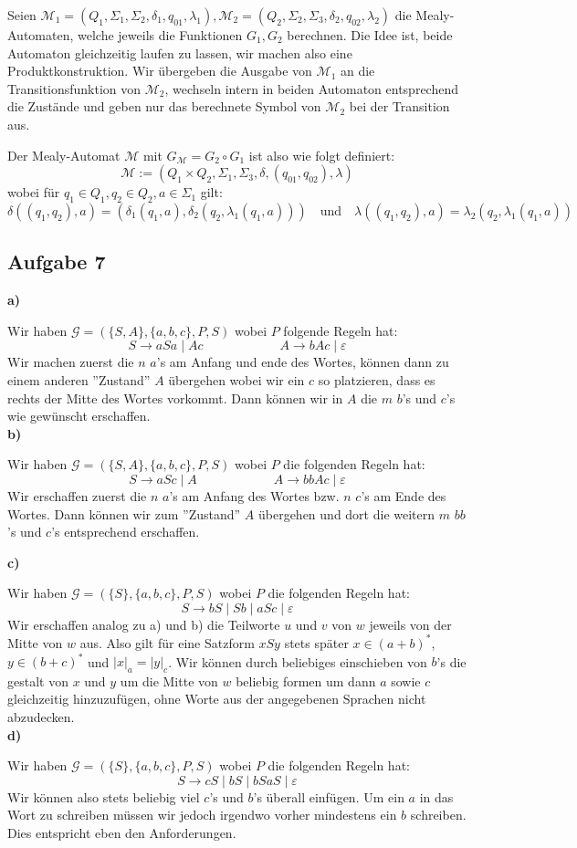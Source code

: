\documentclass[a4paper,graphics,11pt]{article}
\newcommand{\aufgabe}[1]{\subsection*{Aufgabe #1}}
\begin{document}
Seien
$\mathcal{M}_1 = (Q_1, \Sigma_1, \Sigma_2, \delta_1, q_{01}, \lambda_1),
\mathcal{M}_2 = (Q_2, \Sigma_2, \Sigma_3, \delta_2, q_{02}, \lambda_2)$
die Mealy-Automaten, welche jeweils die Funktionen $G_1, G_2$ berechnen.
Die Idee ist, beide Automaton gleichzeitig laufen zu lassen, wir machen also eine Produktkonstruktion.
Wir übergeben die Ausgabe von $\mathcal{M}_1$ an die Transitionsfunktion von $\mathcal{M_2}$, wechseln
intern in beiden Automaton entsprechend die Zustände und geben nur das berechnete Symbol von $\mathcal{M}_2$
bei der Transition aus.

Der Mealy-Automat $\mathcal{M}$ mit $G_{\mathcal{M}} = G_2 \circ G_1$ ist also wie folgt definiert:
$$
    \mathcal{M} := (Q_1 \times Q_2, \Sigma_1, \Sigma_3, \delta, (q_{01}, q_{02}), \lambda)
$$
wobei für $q_1 \in Q_1, q_2 \in Q_2, a \in \Sigma_1$ gilt:
$$
    \delta((q_1,q_2), a) = (\delta_1(q_1, a), \delta_2(q_2, \lambda_1(q_1, a)))
    \quad\text{und}\quad
    \lambda((q_1,q_2), a) = \lambda_2(q_2, \lambda_1(q_1, a))
$$

\aufgabe{7}

\textbf{a)}

Wir haben $\mathcal{G} = (\{S,A\}, \{a,b,c\}, P, S)$ wobei $P$ folgende Regeln hat:
$$
    S \to aSa \mid Ac
    \qquad\qquad\qquad
    A \to bAc \mid \varepsilon
$$
Wir machen zuerst die $n$ $a$'s am Anfang und ende des Wortes, können dann zu einem anderen ''Zustand''
$A$ übergehen wobei wir ein $c$ so platzieren, dass es rechts der Mitte des Wortes vorkommt.
Dann können wir in $A$ die $m$ $b$'s und $c$'s wie gewünscht erschaffen.\\

\textbf{b)}

Wir haben $\mathcal{G} = (\{S, A\}, \{a,b,c\}, P, S)$ wobei $P$ die folgenden Regeln hat:
$$
    S \to aSc \mid A
    \qquad\qquad\qquad
    A \to bbAc \mid \varepsilon
$$
Wir erschaffen zuerst die $n$ $a$'s am Anfang des Wortes bzw. $n$ $c$'s am Ende des Wortes.
Dann können wir zum ''Zustand'' $A$ übergehen und dort die weitern $m$ $bb$'s und $c$'s
entsprechend erschaffen.

\newpage

\textbf{c)}

Wir haben $\mathcal{G} = (\{S\}, \{a,b,c\}, P, S)$ wobei $P$ die folgenden Regeln hat:
$$
    S \to bS \mid Sb \mid aSc \mid \varepsilon
$$
Wir erschaffen analog zu a) und b) die Teilworte $u$ und $v$ von $w$ jeweils von der Mitte von $w$ aus.
Also gilt für eine Satzform $xSy$ stets später $x \in (a+b)^*$, $y \in (b+c)^*$ und $|x|_a = |y|_c$.
Wir können durch beliebiges einschieben von $b$'s die gestalt von $x$ und $y$ um die Mitte von
$w$ beliebig formen um dann $a$ sowie $c$ gleichzeitig hinzuzufügen, ohne Worte aus der angegebenen
Sprachen nicht abzudecken.\\

\textbf{d)}

Wir haben $\mathcal{G} = (\{S\}, \{a,b,c\}, P, S)$ wobei $P$ die folgenden Regeln hat:
$$
    S \to cS \mid bS \mid bSaS \mid \varepsilon
$$
Wir können also stets beliebig viel $c$'s und $b$'s überall einfügen. Um ein $a$ in das Wort
zu schreiben müssen wir jedoch irgendwo vorher mindestens ein $b$ schreiben. Dies entspricht
eben den Anforderungen.
\end{document}
